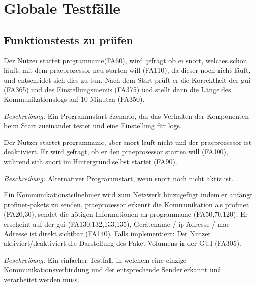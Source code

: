 \chapter{Globale Testfälle}

\section{Funktionstests zu prüfen}

\begin{description}[style=multiline, leftmargin=4cm, labelwidth=4cm]
 
  \item[\namedlabel{start}{Programm starten}] Der Nutzer startet \gls{programname}(FA60), wird gefragt ob er \gls{snort}, welches schon läuft, mit dem \gls{praeprozessor} neu starten will (FA110), da dieser noch nicht läuft, und entscheidet sich dies zu tun. Nach dem Start prüft er die Korrektheit der \gls{gui} (FA365) und des Einstellungsmenüs (FA375) und stellt dann die Länge des Kommunikationslogs auf 10 Minuten (FA350). \par
      \textit{Beschreibung:} Ein Programmstart-Szenario, das das Verhalten der Komponenten beim Start zueinander testet und eine Einstellung für \glspl{log}.
 
  \item[\namedlabel{altstart}{Alternativer Start}] Der Nutzer startet \gls{programname}, aber \gls{snort} läuft nicht und der \gls{praeprozessor} ist deaktiviert. Er wird gefragt, ob er den \gls{praeprozessor} starten will (FA100), während sich \gls{snort} im Hintergrund selbst startet (FA90). \par
      \textit{Beschreibung:} Alternativer Programmstart, wenn \gls{snort} noch nicht aktiv ist.
  
  \item[\namedlabel{addNetNode}{Kommunikationsteilnehmer hinzufügen}] Ein Kommunikationsteilnehmer wird zum Netzwerk hinzugefügt indem er anfängt \gls{profinet}-\glspl{paket} zu senden. \gls{praeprozessor} erkennt die Kommunikation als \gls{profinet} (FA20,30), sendet die nötigen Informationen an \gls{programname} (FA50,70,120). Er erscheint auf der \gls{gui} (FA130,132,133,135), Gerätename / \gls{ip}-Adresse / \gls{mac}-Adresse ist direkt sichtbar (FA140). Falls implementiert: Der Nutzer aktiviert/deaktiviert die Darstellung des Paket-Volumens in der GUI (FA305). \par
      \textit{Beschreibung:} Ein einfacher Testfall, in welchem eine einzige Kommunikationsverbindung und der entsprechende Sender erkannt und verarbeitet werden muss.
  

\end{description}
